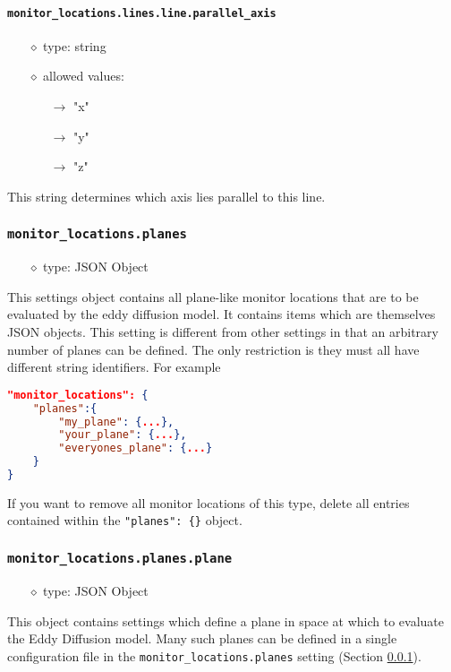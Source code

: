 \documentclass[]{article}
\def\code#1{\texttt{#1}}
\begin{document}
\paragraph{\code{monitor\_locations.lines.line.parallel\_axis}}
\begin{itemize}
    \item[$\diamond$] type: string 
    \item[$\diamond$] allowed values:
    \begin{itemize}
        \item[$\rightarrow$] "x"
        \item[$\rightarrow$] "y"
        \item[$\rightarrow$] "z"
    \end{itemize}
\end{itemize}
This string determines which axis lies parallel to this line.

\subsubsection{\code{monitor\_locations.planes}}\label{sec:monplanes}
\begin{itemize}
    \item[$\diamond$] type: JSON Object 
\end{itemize}
This settings object contains all plane-like monitor locations that are to be
evaluated by the eddy diffusion model. It contains items which
are themselves JSON objects. This setting is different from other settings in
that an arbitrary number of planes can be defined. The only restriction is they
must all have different string identifiers. For example\\
\begin{lstlisting}[language=json,firstnumber=1]
"monitor_locations": {
    "planes":{
        "my_plane": {...},
        "your_plane": {...},
        "everyones_plane": {...}
    }
}
\end{lstlisting}
\medskip

\noindent If you want to remove all monitor locations of this type, delete all
entries contained within the \code{"planes": \{\}} object.

\subsubsection{\code{monitor\_locations.planes.plane}}
\begin{itemize}
    \item[$\diamond$] type: JSON Object 
\end{itemize}
This object contains settings which define a plane in space at which to evaluate
the Eddy Diffusion model. Many such planes can be defined in a single
configuration file in the \code{monitor\_locations.planes} setting (Section
\ref{sec:monplanes}).
\end{document}
